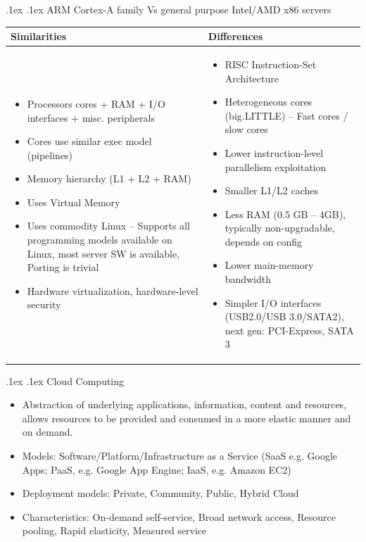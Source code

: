 \documentclass[10pt,landscape,a4paper]{article}
\makeatletter
\renewcommand{\subsection}{\@startsection{subsection}{1}{0mm}%
  {.1ex}%
  {.1ex}%
{\sffamily\bfseries}}
\renewcommand{\subsubsection}{\@startsection{subsubsection}{1}{0mm}%
  {.1ex}%
  {.1ex}%
{\rmfamily\bfseries}}
\makeatother
\begin{document}
\begin{multicols*}{4}
  \subsubsection{ARM Cortex-A family Vs general purpose Intel/AMD x86 servers}
  \begin{tabularx}{\columnwidth}{X|X}
    \textbf{Similarities}       & \textbf{Differences} \\ \hline
    \begin{itemize}
      \item Processors cores + RAM + I/O interfaces + misc. peripherals
      \item Cores use similar exec model (pipelines)
      \item Memory hierarchy (L1 + L2 + RAM)
      \item Uses Virtual Memory
      \item Uses commodity Linux -- Supports all programming models available on Linux, most server SW is available, Porting is trivial
      \item Hardware virtualization, hardware-level security
    \end{itemize} &
    \begin{itemize}
      \item RISC Instruction-Set Architecture
      \item Heterogeneous cores (big.LITTLE) -- Fast cores / slow cores
      \item Lower instruction-level parallelism exploitation
      \item Smaller L1/L2 caches
      \item Less RAM (0.5 GB – 4GB), typically non-upgradable, depends on config
      \item Lower main-memory bandwidth
      \item Simpler I/O interfaces (USB2.0/USB 3.0/SATA2), next gen: PCI-Express, SATA 3
    \end{itemize}
  \end{tabularx}
  \subsection{Cloud Computing}
  \begin{itemize}
    \item Abstraction of underlying applications, information, content and resources, allows resources to be provided and consumed in a more elastic manner and on demand.
    \item Models: Software/Platform/Infrastructure as a Service (SaaS e.g. Google Apps; PaaS, e.g. Google App Engine; IaaS, e.g. Amazon EC2)
    \item Deployment models: Private, Community, Public, Hybrid Cloud
    \item Characteristics: On-demand self-service, Broad network access, Resource pooling, Rapid elasticity, Measured service
  \end{itemize}

\end{multicols*}
\end{document}
